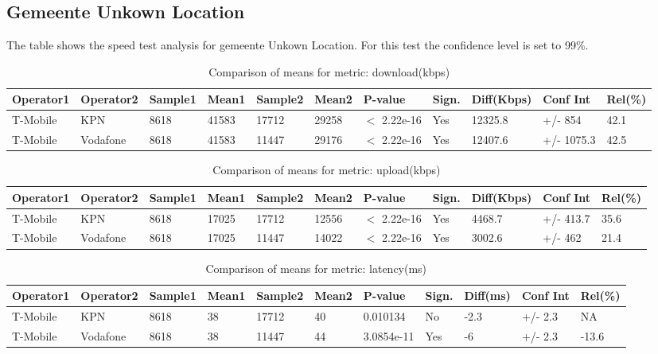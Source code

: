 \documentclass[]{article}
\begin{document}
\normalsize

\newpage

\subsection{Gemeente Unkown Location}\label{gemeente-unkown-location}

The table shows the speed test analysis for gemeente Unkown Location.
For this test the confidence level is set to 99\%.

\begin{table}[ht]
\centering
{\footnotesize
\begin{tabular}{lllllllllll}
  \hline
Operator1 & Operator2 & Sample1 & Mean1 & Sample2 & Mean2 & P-value & Sign. & Diff(Kbps) & Conf Int & Rel(\%) \\ 
  \hline
T-Mobile & KPN & 8618 & 41583 & 17712 & 29258 & $<$ 2.22e-16 & Yes & 12325.8 & +/- 854 & 42.1 \\ 
  T-Mobile & Vodafone & 8618 & 41583 & 11447 & 29176 & $<$ 2.22e-16 & Yes & 12407.6 & +/- 1075.3 & 42.5 \\ 
   \hline
\end{tabular}
}
\caption{Comparison of means for metric: download(kbps)} 
\end{table}\begin{table}[ht]
\centering
{\footnotesize
\begin{tabular}{lllllllllll}
  \hline
Operator1 & Operator2 & Sample1 & Mean1 & Sample2 & Mean2 & P-value & Sign. & Diff(Kbps) & Conf Int & Rel(\%) \\ 
  \hline
T-Mobile & KPN & 8618 & 17025 & 17712 & 12556 & $<$ 2.22e-16 & Yes & 4468.7 & +/- 413.7 & 35.6 \\ 
  T-Mobile & Vodafone & 8618 & 17025 & 11447 & 14022 & $<$ 2.22e-16 & Yes & 3002.6 & +/- 462 & 21.4 \\ 
   \hline
\end{tabular}
}
\caption{Comparison of means for metric: upload(kbps)} 
\end{table}\begin{table}[ht]
\centering
{\footnotesize
\begin{tabular}{lllllllllll}
  \hline
Operator1 & Operator2 & Sample1 & Mean1 & Sample2 & Mean2 & P-value & Sign. & Diff(ms) & Conf Int & Rel(\%) \\ 
  \hline
T-Mobile & KPN & 8618 & 38 & 17712 & 40 & 0.010134 & No & -2.3 & +/- 2.3 & NA \\ 
  T-Mobile & Vodafone & 8618 & 38 & 11447 & 44 & 3.0854e-11 & Yes & -6 & +/- 2.3 & -13.6 \\ 
   \hline
\end{tabular}
}
\caption{Comparison of means for metric: latency(ms)} 
\end{table}
\end{document}
